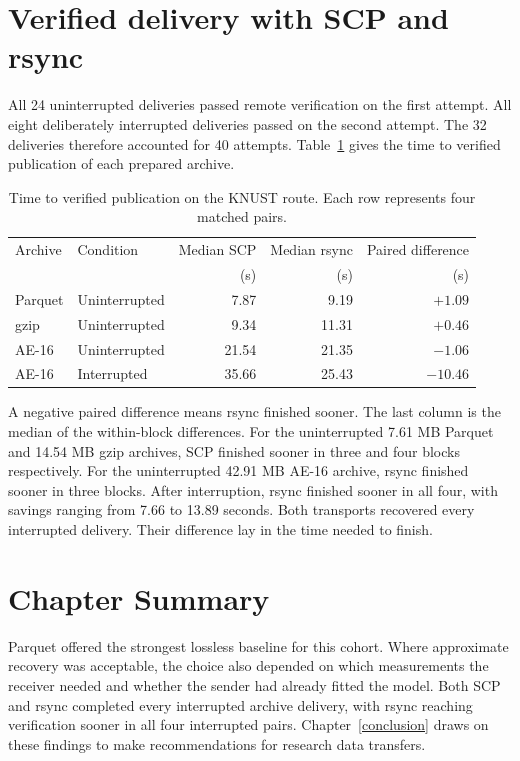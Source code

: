 \section{Verified delivery with SCP and rsync}\label{sec:paired-results}
All 24 uninterrupted deliveries passed remote verification on the first attempt. All eight deliberately interrupted deliveries passed on the second attempt. The 32 deliveries therefore accounted for 40 attempts. Table~\ref{tab:paired-transport} gives the time to verified publication of each prepared archive.

\begin{table}[htbp]
\centering
\caption{Time to verified publication on the KNUST route. Each row represents four matched pairs.}\label{tab:paired-transport}
\begin{tabular}{@{}llrrr@{}}
\toprule
Archive & Condition & Median SCP & Median rsync & Paired difference \\
 & & (s) & (s) & (s) \\
\midrule
Parquet & Uninterrupted & 7.87 & 9.19 & $+1.09$ \\
gzip & Uninterrupted & 9.34 & 11.31 & $+0.46$ \\
AE-16 & Uninterrupted & 21.54 & 21.35 & $-1.06$ \\
AE-16 & Interrupted & 35.66 & 25.43 & $-10.46$ \\
\bottomrule
\end{tabular}
\end{table}

A negative paired difference means rsync finished sooner. The last column is the median of the within-block differences. For the uninterrupted 7.61 MB Parquet and 14.54 MB gzip archives, SCP finished sooner in three and four blocks respectively. For the uninterrupted 42.91 MB AE-16 archive, rsync finished sooner in three blocks. After interruption, rsync finished sooner in all four, with savings ranging from 7.66 to 13.89 seconds. Both transports recovered every interrupted delivery. Their difference lay in the time needed to finish.



\section{Chapter Summary}\label{sec:results-summary}
Parquet offered the strongest lossless baseline for this cohort. Where approximate recovery was acceptable, the choice also depended on which measurements the receiver needed and whether the sender had already fitted the model. Both SCP and rsync completed every interrupted archive delivery, with rsync reaching verification sooner in all four interrupted pairs. Chapter~\ref{conclusion} draws on these findings to make recommendations for research data transfers.
